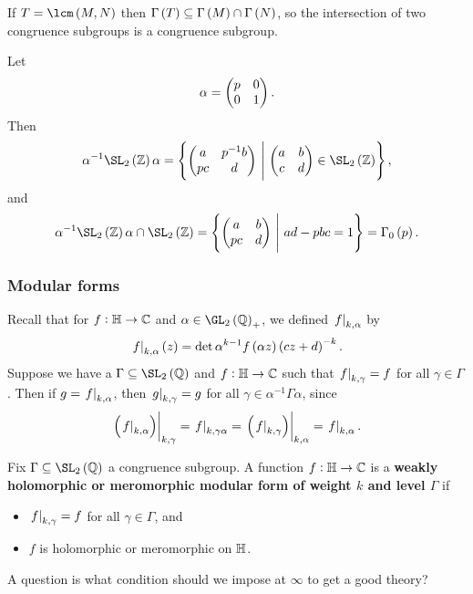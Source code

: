 \begin{note*}
If $ T = \lcm\br{M, N} $ then $ \Gamma\br{T} \subseteq \Gamma\br{M} \cap \Gamma\br{N} $, so the intersection of two congruence subgroups is a congruence subgroup.
\end{note*}

\begin{example*}
Let
$$ \alpha = \begin{pmatrix} p & 0 \\ 0 & 1 \end{pmatrix}. $$
Then
$$ \alpha^{-1}\SL_2\br{\ZZ}\alpha = \cbr{\twobytwo{a}{p^{-1}b}{pc}{d} \st \twobytwo{a}{b}{c}{d} \in \SL_2\br{\ZZ}}, $$
and
$$ \alpha^{-1}\SL_2\br{\ZZ}\alpha \cap \SL_2\br{\ZZ} = \cbr{\twobytwo{a}{b}{pc}{d} \st ad - pbc = 1} = \Gamma_0\br{p}. $$
\end{example*}

\pagebreak

\subsubsection{Modular forms}

Recall that for $ f : \mathbb{H} \to \mathbb{C} $ and $ \alpha \in \GL_2\br{\QQ}_+ $, we defined $ \left. f \right|_{k, \alpha} $ by
$$ \eval{f}_{k, \alpha}\br{z} = \det \alpha^{k - 1}f\br{\alpha z}\br{cz + d}^{-k}. $$
Suppose we have a $ \Gamma \subseteq \SL_2\br{\QQ} $ and $ f : \mathbb{H} \to \mathbb{C} $ such that $ \left. f \right|_{k, \gamma} = f $ for all $ \gamma \in \Gamma $. Then if $ g = \left. f \right|_{k, \alpha} $, then $ \left. g \right|_{k, \gamma} = g $ for all $ \gamma \in \alpha^{-1}\Gamma\alpha $, since
$$ \eval{\br{\eval{f}_{k, \alpha}}}_{k, \gamma} = \eval{f}_{k, \gamma\alpha} = \eval{\br{\eval{f}_{k, \gamma}}}_{k, \alpha} = \eval{f}_{k, \alpha}. $$

\begin{definition}
Fix $ \Gamma \subseteq \SL_2\br{\QQ} $ a congruence subgroup. A function $ f : \mathbb{H} \to \mathbb{C} $ is a \textbf{weakly holomorphic or meromorphic modular form of weight $ k $ and level $ \Gamma $} if
\begin{itemize}
\item $ \left. f \right|_{k, \gamma} = f $ for all $ \gamma \in \Gamma $, and
\item $ f $ is holomorphic or meromorphic on $ \mathbb{H} $.
\end{itemize}
\end{definition}

A question is what condition should we impose at $ \infty $ to get a good theory?

